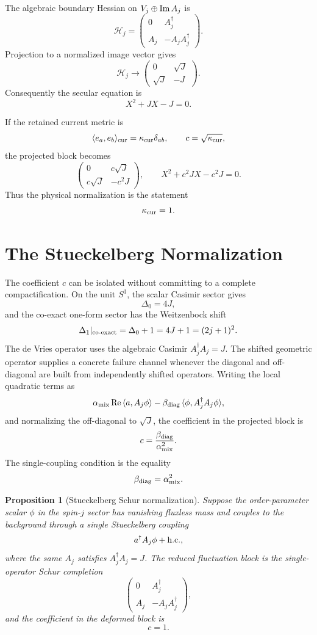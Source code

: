 \documentclass[11pt]{article}
\newtheorem{proposition}{Proposition}
\theoremstyle{definition}
\theoremstyle{remark}
\newcommand{\cH}{\mathcal H}
\begin{document}
The algebraic boundary Hessian on \(V_j\oplus{\rm Im}\,A_j\) is
\[
  \cH_j=
  \begin{pmatrix}
  0&A_j^\dagger\\
  A_j&-A_jA_j^\dagger
  \end{pmatrix}.
\]
Projection to a normalized image vector gives
\[
  \cH_j\longrightarrow
  \begin{pmatrix}
  0&\sqrt J\\
  \sqrt J&-J
  \end{pmatrix}.
\]
Consequently the secular equation is
\[
  X^2+JX-J=0.
\]

If the retained current metric is
\[
  \langle e_a,e_b\rangle_{\rm cur}
  =
  \kappa_{\rm cur}\delta_{ab},
  \qquad c=\sqrt{\kappa_{\rm cur}},
\]
the projected block becomes
\[
  \begin{pmatrix}
  0&c\sqrt J\\
  c\sqrt J&-c^2J
  \end{pmatrix},
  \qquad
  X^2+c^2JX-c^2J=0.
\]
Thus the physical normalization is the statement
\[
  \kappa_{\rm cur}=1.
\]


\section{The Stueckelberg Normalization}

The coefficient \(c\) can be isolated without committing to a complete
compactification.  On the unit \(S^3\), the scalar Casimir sector gives
\[
  \Delta_0=4J,
\]
and the co-exact one-form sector has the Weitzenbock shift
\[
  \Delta_1|_{\rm co\text{-}exact}=\Delta_0+1=4J+1=(2j+1)^2.
\]
The de Vries operator uses the algebraic Casimir \(A_j^\dagger A_j=J\).
The shifted geometric operator supplies a concrete failure channel whenever
the diagonal and off-diagonal are built from independently shifted operators.
Writing the local quadratic terms as
\[
  \alpha_{\rm mix}\,{\rm Re}\,\langle a,A_j\phi\rangle
  -
  \beta_{\rm diag}\,
  \langle\phi,A_j^\dagger A_j\phi\rangle,
\]
and normalizing the off-diagonal to \(\sqrt J\), the coefficient in the
projected block is
\[
  c=\frac{\beta_{\rm diag}}{\alpha_{\rm mix}^2}.
\]
The single-coupling condition is the equality
\[
  \beta_{\rm diag}=\alpha_{\rm mix}^2.
\]

\begin{proposition}[Stueckelberg Schur normalization]
\label{prop:stueckelberg}
Suppose the order-parameter scalar \(\phi\) in the spin-\(j\) sector has
vanishing fluxless mass and couples to the background through a single
Stueckelberg coupling
\[
  a^\dagger A_j\phi+\hbox{h.c.},
\]
where the same \(A_j\) satisfies \(A_j^\dagger A_j=J\).  The reduced
fluctuation block is the single-operator Schur completion
\[
  \begin{pmatrix}
  0&A_j^\dagger\\
  A_j&-A_jA_j^\dagger
  \end{pmatrix},
\]
and the coefficient in the deformed block is
\[
  c=1.
\]
\end{proposition}
\end{document}
